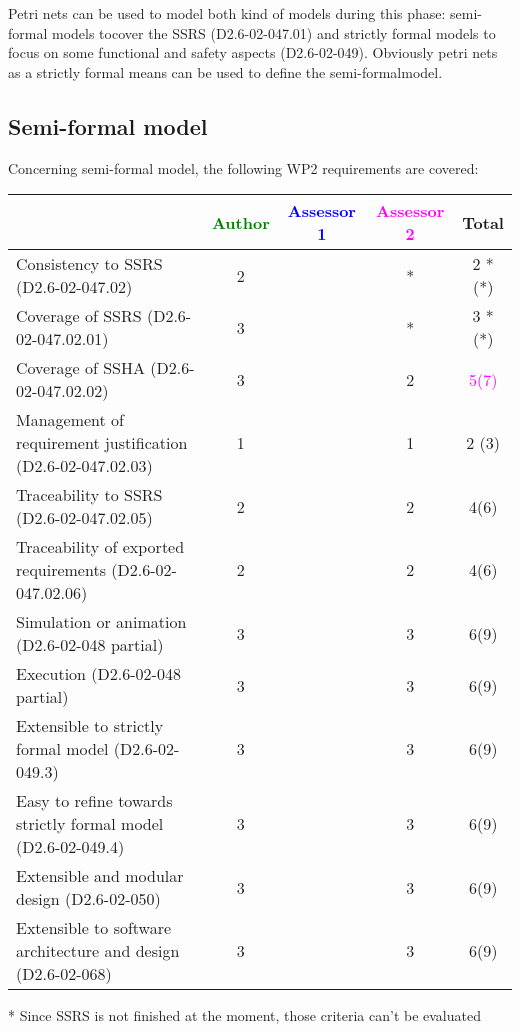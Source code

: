 Petri nets can be used to model both kind of models during this phase: semi-formal models tocover the SSRS (D2.6-02-047.01) and strictly formal  models to  focus on some functional and safety aspects (D2.6-02-049).  Obviously petri nets as a strictly  formal means can be used to define the semi-formalmodel.

\subsection{Semi-formal model}

Concerning semi-formal model, the following WP2 requirements are covered:

\begin{tabular}{|l | c | c | c | c|}
\hline
& \textcolor{green}{Author} & \textcolor{blue}{Assessor 1} & \textcolor{magenta}{Assessor 2} & Total \\
\hline 
Consistency to SSRS (D2.6-02-047.02) & 2     & & * & 2 *(*) \\
\hline
Coverage of SSRS (D2.6-02-047.02.01)  & 3     & & * & 3 *(*) \\
\hline
Coverage of SSHA (D2.6-02-047.02.02)  & 3     & & 2     & \textcolor{magenta}{5(7)}  \\
\hline
Management of requirement justification (D2.6-02-047.02.03)  & 1     & & 1     & 2 (3) \\
\hline
Traceability to  SSRS (D2.6-02-047.02.05)  & 2     & & 2     &  4(6) \\
\hline
Traceability of exported requirements (D2.6-02-047.02.06)  & 2     & & 2     &  4(6) \\
\hline
Simulation or animation (D2.6-02-048 partial)  & 3     & & 3     &  6(9) \\
\hline
Execution (D2.6-02-048 partial)  & 3     & & 3     &  6(9) \\
\hline
Extensible to strictly formal model (D2.6-02-049.3) & 3     & & 3     &  6(9) \\
\hline
Easy to  refine towards strictly formal model (D2.6-02-049.4) & 3     & & 3     &  6(9) \\
\hline
Extensible and modular design (D2.6-02-050)  & 3     & & 3     &  6(9) \\
\hline
Extensible to software architecture and design (D2.6-02-068)   & 3     & & 3     &  6(9) \\
\hline
\end{tabular}

\begin{assessor2}
* Since SSRS is not finished at the moment, those criteria can't be evaluated
\end{assessor2}


